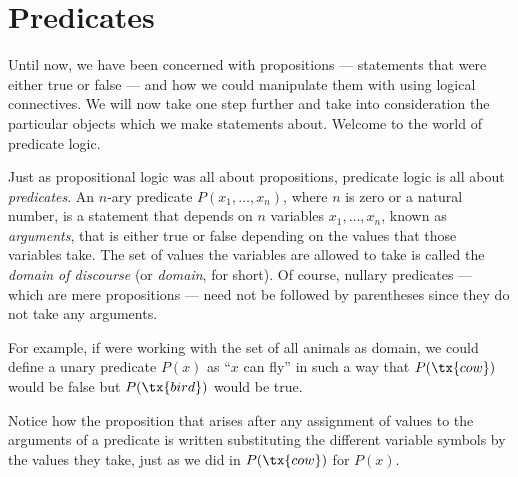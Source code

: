
\section{Predicates}

\begin{para}
Until now, we have been concerned with propositions --- statements that were either true or false --- and how we could manipulate them with using logical connectives.
We will now take one step further and take into consideration the particular objects which we make statements about.
Welcome to the world of predicate logic.
\end{para}

\begin{para}[Predicates]
Just as propositional logic was all about propositions, predicate logic is all about \emph{predicates}.
An $n$-ary predicate $P(x_1,\ldots,x_n)$, where $n$ is zero or a natural number, is a statement that depends on $n$ variables $x_1,\ldots,x_n$, known as \emph{arguments}, that is either true or false depending on the values that those variables take.
The set of values the variables are allowed to take is called the \emph{domain of discourse} (or \emph{domain}, for short).
Of course, nullary predicates --- which are mere propositions --- need not be followed by parentheses since they do not take any arguments.

For example, if were working with the set of all animals as domain, we could define a unary predicate $P(x)$ as ``$x$ can fly'' in such a way that $P(\tx{cow})$ would be false but $P(\tx{bird})$ would be true.

Notice how the proposition that arises after any assignment of values to the arguments of a predicate is written substituting the different variable symbols by the values they take, just as we did in $P(\tx{cow})$ for $P(x)$.


\end{para}

